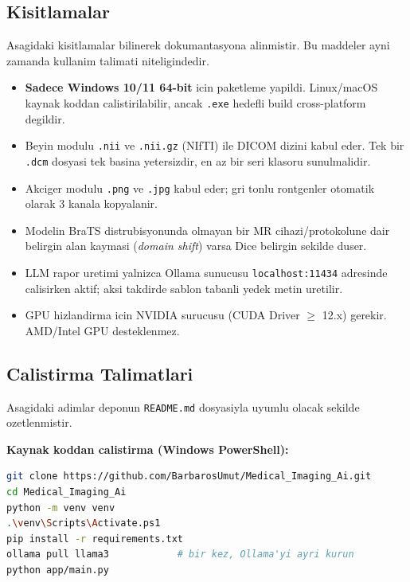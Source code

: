 \documentclass[conference]{IEEEtran}
\begin{document}
\subsection{Kisitlamalar}

Asagidaki kisitlamalar bilinerek dokumantasyona alinmistir. Bu maddeler ayni
zamanda kullanim talimati niteligindedir.

\begin{itemize}
  \item \textbf{Sadece Windows 10/11 64-bit} icin paketleme yapildi. Linux/macOS
        kaynak koddan calistirilabilir, ancak \texttt{.exe} hedefli build
        cross-platform degildir.
  \item Beyin modulu \texttt{.nii} ve \texttt{.nii.gz} (NIfTI) ile DICOM dizini
        kabul eder. Tek bir \texttt{.dcm} dosyasi tek basina yetersizdir, en az
        bir seri klasoru sunulmalidir.
  \item Akciger modulu \texttt{.png} ve \texttt{.jpg} kabul eder; gri tonlu
        rontgenler otomatik olarak 3 kanala kopyalanir.
  \item Modelin BraTS distrubisyonunda olmayan bir MR cihazi/protokolune dair
        belirgin alan kaymasi (\emph{domain shift}) varsa Dice belirgin sekilde
        duser.
  \item LLM rapor uretimi yalnizca Ollama sunucusu \texttt{localhost:11434}
        adresinde calisirken aktif; aksi takdirde sablon tabanli yedek metin
        uretilir.
  \item GPU hizlandirma icin NVIDIA surucusu (CUDA Driver $\ge$ 12.x) gerekir.
        AMD/Intel GPU desteklenmez.
\end{itemize}

\subsection{Calistirma Talimatlari}

Asagidaki adimlar deponun \texttt{README.md} dosyasiyla uyumlu olacak sekilde
ozetlenmistir.

\noindent\textbf{Kaynak koddan calistirma (Windows PowerShell):}
\begin{lstlisting}[language=bash]
git clone https://github.com/BarbarosUmut/Medical_Imaging_Ai.git
cd Medical_Imaging_Ai
python -m venv venv
.\venv\Scripts\Activate.ps1
pip install -r requirements.txt
ollama pull llama3            # bir kez, Ollama'yi ayri kurun
python app/main.py
\end{lstlisting}
\end{document}
